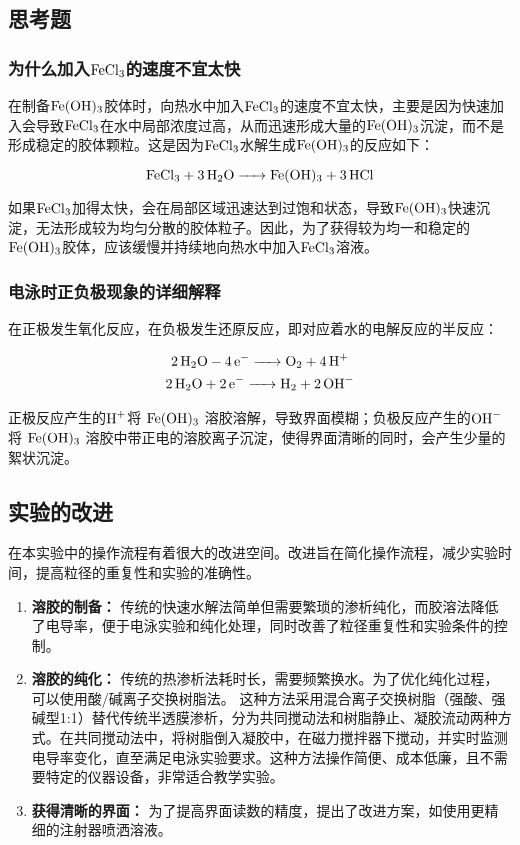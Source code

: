 \subsection{思考题}

\subsubsection{为什么加入\(\ce{FeCl3}\)的速度不宜太快}

在制备\(\ce{Fe(OH)3}\)胶体时，向热水中加入\(\ce{FeCl3}\)的速度不宜太快，主要是因为快速加入会导致\(\ce{FeCl3}\)在水中局部浓度过高，从而迅速形成大量的\(\ce{Fe(OH)3}\)沉淀，而不是形成稳定的胶体颗粒。这是因为\(\ce{FeCl3}\)水解生成\(\ce{Fe(OH)3}\)的反应如下：

\[
\ce{FeCl3 + 3H2O -> Fe(OH)3 + 3HCl}
\]

如果\(\ce{FeCl3}\)加得太快，会在局部区域迅速达到过饱和状态，导致\(\ce{Fe(OH)3}\)快速沉淀，无法形成较为均匀分散的胶体粒子。因此，为了获得较为均一和稳定的\(\ce{Fe(OH)3}\)胶体，应该缓慢并持续地向热水中加入\(\ce{FeCl3}\)溶液。

\subsubsection{电泳时正负极现象的详细解释}

在正极发生氧化反应，在负极发生还原反应，即对应着水的电解反应的半反应：

\[
\begin{gathered}
\ce{2H2O - 4e- -> O2 + 4H+}\\
\ce{2H2O + 2e- -> H2 + 2OH-} 
\end{gathered}
\]

正极反应产生的$ \ce{H+} $将 \(\ce{Fe(OH)3}\) 溶胶溶解，导致界面模糊；负极反应产生的$ \ce{OH-} $将 \(\ce{Fe(OH)3}\) 溶胶中带正电的溶胶离子沉淀，使得界面清晰的同时，会产生少量的絮状沉淀。

\subsection{实验的改进}

在本实验中的操作流程有着很大的改进空间。改进旨在简化操作流程，减少实验时间，提高粒径的重复性和实验的准确性。

\begin{enumerate}
    \item \textbf{溶胶的制备：} 传统的快速水解法简单但需要繁琐的渗析纯化，而胶溶法\cite{ruan2015hydroxide}降低了电导率，便于电泳实验和纯化处理，同时改善了粒径重复性和实验条件的控制。
    \item \textbf{溶胶的纯化：} 传统的热渗析法耗时长，需要频繁换水。为了优化纯化过程，可以使用酸/碱离子交换树脂法\cite{fan2009fe}。
    这种方法采用混合离子交换树脂（强酸、强碱型1:1）替代传统半透膜渗析，分为共同搅动法和树脂静止、凝胶流动两种方式。在共同搅动法中，将树脂倒入凝胶中，在磁力搅拌器下搅动，并实时监测电导率变化，直至满足电泳实验要求。这种方法操作简便、成本低廉，且不需要特定的仪器设备，非常适合教学实验。
    \item \textbf{获得清晰的界面：} 为了提高界面读数的精度，提出了改进方案，如使用更精细的注射器喷洒溶液。
\end{enumerate}

